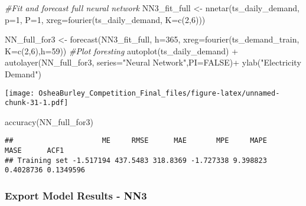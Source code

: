 \documentclass[
]{article}
\newenvironment{Shaded}{\begin{snugshade}}{\end{snugshade}}
\newcommand{\AttributeTok}[1]{\textcolor[rgb]{0.77,0.63,0.00}{#1}}
\newcommand{\CommentTok}[1]{\textcolor[rgb]{0.56,0.35,0.01}{\textit{#1}}}
\newcommand{\ConstantTok}[1]{\textcolor[rgb]{0.00,0.00,0.00}{#1}}
\newcommand{\DecValTok}[1]{\textcolor[rgb]{0.00,0.00,0.81}{#1}}
\newcommand{\FunctionTok}[1]{\textcolor[rgb]{0.00,0.00,0.00}{#1}}
\newcommand{\NormalTok}[1]{#1}
\newcommand{\OtherTok}[1]{\textcolor[rgb]{0.56,0.35,0.01}{#1}}
\newcommand{\SpecialCharTok}[1]{\textcolor[rgb]{0.00,0.00,0.00}{#1}}
\newcommand{\StringTok}[1]{\textcolor[rgb]{0.31,0.60,0.02}{#1}}
\begin{document}
\begin{Shaded}
\begin{Highlighting}[]
\CommentTok{\#Fit and forecast full neural network}
\NormalTok{NN3\_fit\_full }\OtherTok{\textless{}{-}}  \FunctionTok{nnetar}\NormalTok{(ts\_daily\_demand,}
                 \AttributeTok{p=}\DecValTok{1}\NormalTok{,}
                 \AttributeTok{P=}\DecValTok{1}\NormalTok{,}
                 \AttributeTok{xreg=}\FunctionTok{fourier}\NormalTok{(ts\_daily\_demand, }\AttributeTok{K=}\FunctionTok{c}\NormalTok{(}\DecValTok{2}\NormalTok{,}\DecValTok{6}\NormalTok{)))}

\NormalTok{NN\_full\_for3 }\OtherTok{\textless{}{-}} \FunctionTok{forecast}\NormalTok{(NN3\_fit\_full, }
                   \AttributeTok{h=}\DecValTok{365}\NormalTok{,}
                   \AttributeTok{xreg=}\FunctionTok{fourier}\NormalTok{(ts\_demand\_train, }
                                          \AttributeTok{K=}\FunctionTok{c}\NormalTok{(}\DecValTok{2}\NormalTok{,}\DecValTok{6}\NormalTok{),}\AttributeTok{h=}\DecValTok{59}\NormalTok{))}
\CommentTok{\#Plot foresting }
\FunctionTok{autoplot}\NormalTok{(ts\_daily\_demand) }\SpecialCharTok{+}
  \FunctionTok{autolayer}\NormalTok{(NN\_full\_for3, }\AttributeTok{series=}\StringTok{"Neural Network"}\NormalTok{,}\AttributeTok{PI=}\ConstantTok{FALSE}\NormalTok{)}\SpecialCharTok{+}
  \FunctionTok{ylab}\NormalTok{(}\StringTok{"Electricity Demand"}\NormalTok{) }
\end{Highlighting}
\end{Shaded}

\texttt{[image: OsheaBurley\_Competition\_Final\_files/figure-latex/unnamed-chunk-31-1.pdf]}

\begin{Shaded}
\begin{Highlighting}[]
\FunctionTok{accuracy}\NormalTok{(NN\_full\_for3)}
\end{Highlighting}
\end{Shaded}

\begin{verbatim}
##                     ME     RMSE      MAE       MPE     MAPE      MASE      ACF1
## Training set -1.517194 437.5483 318.8369 -1.727338 9.398823 0.4028736 0.1349596
\end{verbatim}

\hypertarget{export-model-results---nn3}{%
\subsubsection{Export Model Results -
NN3}\label{export-model-results---nn3}}
\end{document}

